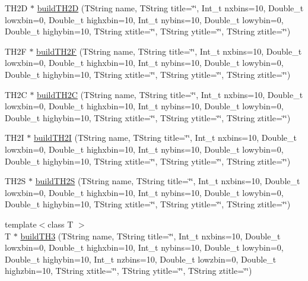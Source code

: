 \begin{DoxyCompactItemize}
\item 
T\+H2\+D $\ast$ \hyperlink{namespace_h_a_l_aeb630f07e99d3e1f7c2963e733fb1994}{build\+T\+H2\+D} (T\+String name, T\+String title=\char`\"{}\char`\"{}, Int\+\_\+t nxbins=10, Double\+\_\+t lowxbin=0, Double\+\_\+t highxbin=10, Int\+\_\+t nybins=10, Double\+\_\+t lowybin=0, Double\+\_\+t highybin=10, T\+String xtitle=\char`\"{}\char`\"{}, T\+String ytitle=\char`\"{}\char`\"{}, T\+String ztitle=\char`\"{}\char`\"{})
\item 
T\+H2\+F $\ast$ \hyperlink{namespace_h_a_l_a5943318187a6b7f012ababfb95056ac0}{build\+T\+H2\+F} (T\+String name, T\+String title=\char`\"{}\char`\"{}, Int\+\_\+t nxbins=10, Double\+\_\+t lowxbin=0, Double\+\_\+t highxbin=10, Int\+\_\+t nybins=10, Double\+\_\+t lowybin=0, Double\+\_\+t highybin=10, T\+String xtitle=\char`\"{}\char`\"{}, T\+String ytitle=\char`\"{}\char`\"{}, T\+String ztitle=\char`\"{}\char`\"{})
\item 
T\+H2\+C $\ast$ \hyperlink{namespace_h_a_l_a59fdb2d6800cc9438744400700453c0b}{build\+T\+H2\+C} (T\+String name, T\+String title=\char`\"{}\char`\"{}, Int\+\_\+t nxbins=10, Double\+\_\+t lowxbin=0, Double\+\_\+t highxbin=10, Int\+\_\+t nybins=10, Double\+\_\+t lowybin=0, Double\+\_\+t highybin=10, T\+String xtitle=\char`\"{}\char`\"{}, T\+String ytitle=\char`\"{}\char`\"{}, T\+String ztitle=\char`\"{}\char`\"{})
\item 
T\+H2\+I $\ast$ \hyperlink{namespace_h_a_l_ae41203cecd0351be222b3fc729b3c8dc}{build\+T\+H2\+I} (T\+String name, T\+String title=\char`\"{}\char`\"{}, Int\+\_\+t nxbins=10, Double\+\_\+t lowxbin=0, Double\+\_\+t highxbin=10, Int\+\_\+t nybins=10, Double\+\_\+t lowybin=0, Double\+\_\+t highybin=10, T\+String xtitle=\char`\"{}\char`\"{}, T\+String ytitle=\char`\"{}\char`\"{}, T\+String ztitle=\char`\"{}\char`\"{})
\item 
T\+H2\+S $\ast$ \hyperlink{namespace_h_a_l_a8e459c6c5a2375f74f89987abefdee23}{build\+T\+H2\+S} (T\+String name, T\+String title=\char`\"{}\char`\"{}, Int\+\_\+t nxbins=10, Double\+\_\+t lowxbin=0, Double\+\_\+t highxbin=10, Int\+\_\+t nybins=10, Double\+\_\+t lowybin=0, Double\+\_\+t highybin=10, T\+String xtitle=\char`\"{}\char`\"{}, T\+String ytitle=\char`\"{}\char`\"{}, T\+String ztitle=\char`\"{}\char`\"{})
\item 
{\footnotesize template$<$class T $>$ }\\T $\ast$ \hyperlink{namespace_h_a_l_a02169d3addb34058f91af082963a56ef}{build\+T\+H3} (T\+String name, T\+String title=\char`\"{}\char`\"{}, Int\+\_\+t nxbins=10, Double\+\_\+t lowxbin=0, Double\+\_\+t highxbin=10, Int\+\_\+t nybins=10, Double\+\_\+t lowybin=0, Double\+\_\+t highybin=10, Int\+\_\+t nzbins=10, Double\+\_\+t lowzbin=0, Double\+\_\+t highzbin=10, T\+String xtitle=\char`\"{}\char`\"{}, T\+String ytitle=\char`\"{}\char`\"{}, T\+String ztitle=\char`\"{}\char`\"{})

\end{DoxyCompactItemize}
